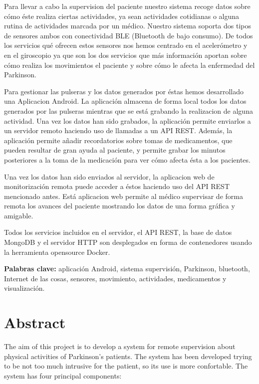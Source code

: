 \documentclass[11pt,spanish]{article}
\newcommand\blankpage{%
    \null
    \thispagestyle{empty}%
    \addtocounter{page}{-1}%
    \newpage}
\begin{document}
Para llevar a cabo la supervision del paciente nuestro sistema recoge datos sobre cómo éste realiza ciertas actividades, ya sean actividades cotidianas o alguna rutina de actividades marcada por un médico. Nuestro sistema soporta dos tipos de sensores ambos con conectividad BLE (Bluetooth de bajo consumo). De todos los servicios qué ofrecen estos sensores nos hemos centrado en el acelerómetro y en el giroscopio ya que son los dos servicios que más información aportan sobre cómo realiza los movimientos el paciente y sobre cómo le afecta la enfermedad del Parkinson.
\newline

Para gestionar las pulseras y los datos generados por éstas hemos desarrollado una Aplicacion Android. La aplicación almacena de forma local todos los datos generados por las pulseras mientras que se está grabando la realizacion de alguna actividad. Una vez los datos han sido grabados, la aplicación permite enviarlos a un servidor remoto haciendo uso de llamadas a un API REST. Además, la aplicación permite añadir recordatorios sobre tomas de medicamentos, que pueden resultar de gran ayuda al paciente, y permite grabar los minutos posteriores a la toma de la medicación para ver cómo afecta ésta a los pacientes.
\newline

Una vez los datos han sido enviados al servidor, la aplicacion web de monitorización remota puede acceder a éstos haciendo uso del API REST mencionado antes. Está aplicacion web permite al médico supervisar de forma remota los avances del paciente mostrando los datos de una forma gráfica y amigable.
\newline

Todos los servicios incluidos en el servidor, el API REST, la base de datos MongoDB y el servidor HTTP son desplegados en forma de contenedores usando la herramienta opensource Docker.
\newline

{\bf Palabras clave:} aplicación Android, sistema supervisión, Parkinson, bluetooth, Internet de las cosas, sensores, movimiento, actividades, medicamentos y visualización.
\newpage

\blankpage

\section*{Abstract}
The aim of this project is to develop a system for remote supervision about physical activities of Parkinson's patients. The system has been developed trying to be not too much intrusive for the patient, so its use is more confortable. The system has four principal components:
\end{document}
